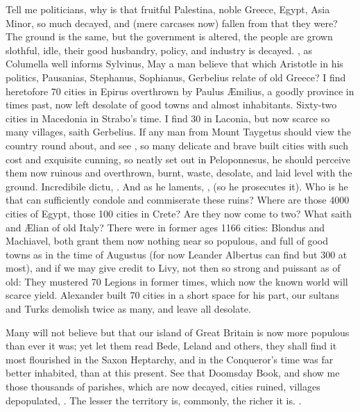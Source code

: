 Tell me politicians, why is that fruitful Palestina, noble Greece,
Egypt, Asia Minor, so much decayed, and (mere carcases now) fallen from
that they were? The ground is the same, but the government is altered,
the people are grown slothful, idle, their good husbandry, policy, and
industry is decayed. , as Columella
well informs Sylvinus,  May a man believe
that which Aristotle in his politics, Pausanias, Stephanus, Sophianus,
Gerbelius relate of old Greece? I find heretofore 70 cities in Epirus
overthrown by Paulus \AE{}milius, a goodly province in times past,
now left desolate of good towns and almost inhabitants. Sixty-two
cities in Macedonia in Strabo's time. I find 30 in Laconia, but now
scarce so many villages, saith Gerbelius. If any man from Mount
Taygetus should view the country round about, and see , so many delicate and brave built
cities with such cost and exquisite cunning, so neatly set out in
Peloponnesus, he should perceive them now ruinous and overthrown,
burnt, waste, desolate, and laid level with the ground. Incredibile
dictu, \etc{}. And as he laments, , (so he prosecutes it). Who is he that
can sufficiently condole and commiserate these ruins? Where are those
4000 cities of Egypt, those 100 cities in Crete? Are they now come to
two? What saith \Pliny{} and \AE{}lian of old Italy? There were in former
ages 1166 cities: Blondus and Machiavel, both grant them now nothing
near so populous, and full of good towns as in the time of Augustus
(for now Leander Albertus can find but 300 at most), and if we may give
credit to Livy, not then so strong and puissant as of old: They
mustered 70 Legions in former times, which now the known world will
scarce yield. Alexander built 70 cities in a short space for his part,
our sultans and Turks demolish twice as many, and leave all desolate.

Many will not believe but that our island of Great Britain is now more
populous than ever it was; yet let them read Bede, Leland and others,
they shall find it most flourished in the Saxon Heptarchy, and in the
Conqueror's time was far better inhabited, than at this present. See
that Doomsday Book, and show me those thousands of parishes, which are
now decayed, cities ruined, villages depopulated, \etc{}. The lesser the
territory is, commonly, the richer it is. .

